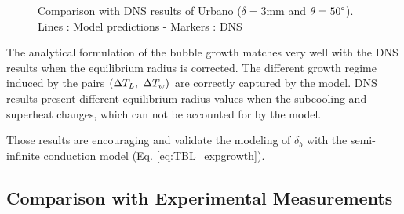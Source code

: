 \begin{figure}[h!]
\caption{Comparison with DNS results of Urbano \etal \cite{urbano_direct_2019} ($\delta=3$mm and $\theta=50\degree$). Lines : Model predictions - Markers : DNS }
\label{fig:growth_comp_urbano}
\end{figure}

The analytical formulation of the bubble growth matches very well with the DNS results when the equilibrium radius is corrected. The different growth regime induced by the pairs $\left( \Delta T_{L},\ \Delta T_{w} \right)$ are correctly captured by the model. DNS results present different equilibrium radius values when the subcooling and superheat changes, which can not be accounted for by the model.

\npar

\begin{remark*}{}
Those results are encouraging and validate the modeling of $\delta_{b}$ with the semi-infinite conduction model (Eq. \ref{eq:TBL_expgrowth}).
\end{remark*}



\subsection{Comparison with Experimental Measurements}

